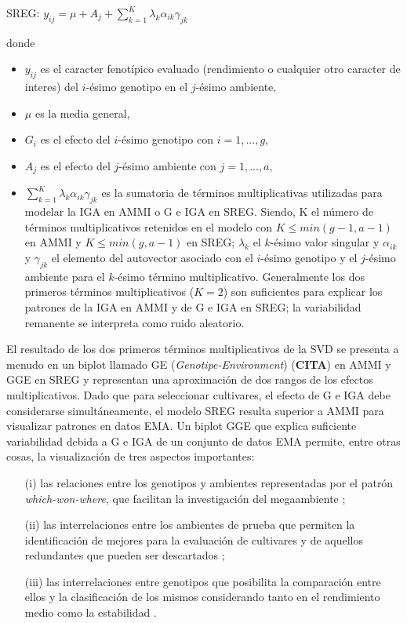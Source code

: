 \hspace{0.5cm} SREG: $y_{ij}= \mu + A_j + \sum_{k=1}^K \lambda_k \alpha_{ik} \gamma_{jk}$ 

donde 
\begin{itemize}
\item $y_{ij}$ es el caracter fenotípico evaluado (rendimiento o cualquier otro caracter de interes) del $i$-ésimo genotipo en el $j$-ésimo ambiente,
\item $\mu$ es la media general,
\item  $G_i$ es el efecto del $i$-ésimo genotipo con $i=1,...,g$,
\item $A_j$ es el efecto del $j$-ésimo ambiente con $j=1,...,a$,
\item $\sum_{k=1}^K \lambda_k \alpha_{ik} \gamma_{jk}$ es la sumatoria de términos multiplicativas utilizadas para modelar la IGA en AMMI o G e IGA en SREG. Siendo, K el número de términos multiplicativos retenidos en el modelo con $K \leq min(g-1,a-1)$ en AMMI y $K \leq min(g,a-1)$ en SREG; $\lambda_k$ el $k$-ésimo valor singular y $\alpha_{ik}$ y $\gamma_{jk}$ el elemento del autovector asociado con el $i$-ésimo genotipo y el $j$-ésimo ambiente para el $k$-ésimo término multiplicativo. Generalmente los dos primeros términos multiplicativos ($K=2$) son suficientes para explicar los patrones de la IGA en AMMI y de G e IGA en SREG; la variabilidad remanente se interpreta como ruido aleatorio. 
\end{itemize}


El resultado de los dos primeros términos multiplicativos de la SVD se presenta a menudo en un biplot llamado GE (\emph{Genotipe-Environment}) (\textbf{CITA}) en AMMI y GGE en SREG \citep{Yanetal2000} y representan una aproximación de dos rangos de los efectos multiplicativos. Dado que para seleccionar cultivares, el efecto de G e IGA debe considerarse simultáneamente, el modelo SREG resulta superior a AMMI para visualizar patrones en datos EMA. Un biplot GGE que explica suficiente variabilidad debida a G e IGA de un conjunto de datos EMA permite, entre otras cosas, la visualización de tres aspectos importantes: 

\begin{itemize}
\item[(i)] las relaciones entre los genotipos y ambientes representadas por el patrón \emph{which-won-where}, que facilitan la investigación del megaambiente \citep{GauchZobel1997};

\item[(ii)] las interrelaciones entre los ambientes de prueba que permiten la identificación de mejores para la evaluación de cultivares \citep{Cooperetal1997} y de aquellos redundantes que pueden ser descartados \citep{YanRajcan2002};

\item[(iii)] las interrelaciones entre genotipos que posibilita la comparación entre ellos y la clasificación de los mismos considerando tanto en el rendimiento medio como la estabilidad \citep{Yanetal2001}.
\end{itemize}

